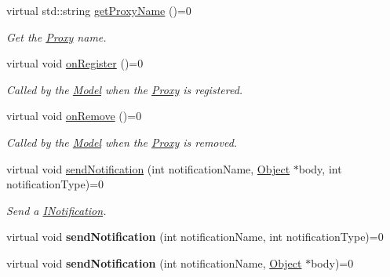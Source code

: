 \begin{DoxyCompactItemize}
\item 
virtual std::string \hyperlink{class_pure_m_v_c_1_1_i_proxy_restricted_ae52c8f9de4c2f4a4b90e97006e0b08f9}{getProxyName} ()=0
\begin{DoxyCompactList}\small\item\em Get the \hyperlink{class_pure_m_v_c_1_1_proxy}{Proxy} name. \item\end{DoxyCompactList}\item 
virtual void \hyperlink{class_pure_m_v_c_1_1_i_proxy_restricted_a450f14bba0bde7c94e5868e844f1fdf2}{onRegister} ()=0
\begin{DoxyCompactList}\small\item\em Called by the \hyperlink{class_pure_m_v_c_1_1_model}{Model} when the \hyperlink{class_pure_m_v_c_1_1_proxy}{Proxy} is registered. \item\end{DoxyCompactList}\item 
virtual void \hyperlink{class_pure_m_v_c_1_1_i_proxy_restricted_a6d883fcf5a5e241321f5b5d9521ba158}{onRemove} ()=0
\begin{DoxyCompactList}\small\item\em Called by the \hyperlink{class_pure_m_v_c_1_1_model}{Model} when the \hyperlink{class_pure_m_v_c_1_1_proxy}{Proxy} is removed. \item\end{DoxyCompactList}\item 
virtual void \hyperlink{class_pure_m_v_c_1_1_i_notifier_a65e8333ccfea74138b79f84dac96af25}{sendNotification} (int notificationName, \hyperlink{class_pure_m_v_c_1_1_object}{Object} $\ast$body, int notificationType)=0
\begin{DoxyCompactList}\small\item\em Send a {\ttfamily \hyperlink{class_pure_m_v_c_1_1_i_notification}{INotification}}. \item\end{DoxyCompactList}\item 
\hypertarget{class_pure_m_v_c_1_1_i_notifier_ad9421945c1e0fd6d7ebbc136f9ecfba3}{
virtual void {\bfseries sendNotification} (int notificationName, int notificationType)=0}
\label{class_pure_m_v_c_1_1_i_notifier_ad9421945c1e0fd6d7ebbc136f9ecfba3}

\item 
\hypertarget{class_pure_m_v_c_1_1_i_notifier_a4d6bac0719be96948e4f7417489daeaa}{
virtual void {\bfseries sendNotification} (int notificationName, \hyperlink{class_pure_m_v_c_1_1_object}{Object} $\ast$body)=0}
\label{class_pure_m_v_c_1_1_i_notifier_a4d6bac0719be96948e4f7417489daeaa}


\end{DoxyCompactItemize}
